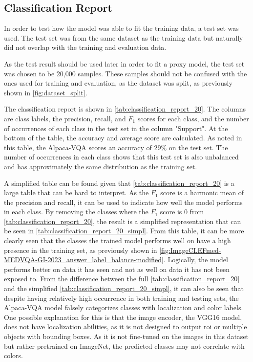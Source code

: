     \subsection{Classification Report}
        In order to test how the model was able to fit the training data, a test set was used. The test set was from the same dataset as the training data but naturally did not overlap with the training and evaluation data. 

        As the test result should be used later in order to fit a proxy model, the test set was chosen to be 20,000 samples. These samples should not be confused with the ones used for training and evaluation, as the dataset was split, as previously shown in \autoref{fig:dataset_split}.

        The classification report is shown in \autoref{tab:classification_report_20}. The columns are class labels, the precision, recall, and $F_1$ scores for each class, and the number of occurrences of each class in the test set in the column "Support". At the bottom of the table, the accuracy and average score are calculated. As noted in this table, the Alpaca-VQA scores an accuracy of 29\% on the test set. The number of occurrences in each class shows that this test set is also unbalanced and has approximately the same distribution as the training set.
        
        A simplified table can be found given that \autoref{tab:classification_report_20} is a large table that can be hard to interpret.
        As the $F_1$ score is a harmonic mean of the precision and recall, it can be used to indicate how well the model performs in each class. By removing the classes where the $F_1$ score is 0 from \autoref{tab:classification_report_20}, the result is a simplified representation that can be seen in \autoref{tab:classification_report_20_simpl}.
        From this table, it can be more clearly seen that the classes the trained model performs well on have a high presence in the training set, as previously shown in \autoref{fig:ImageCLEFmed-MEDVQA-GI-2023_answer_label_balance-modified}. Logically, the model performs better on data it has seen and not as well on data it has not been exposed to. From the difference between the full \autoref{tab:classification_report_20} and the simplified \autoref{tab:classification_report_20_simpl}, it can also be seen that despite having relatively high occurrence in both training and testing sets, the Alpaca-VQA model falsely categorizes classes with localization and color labels.
        One possible explanation for this is that the image encoder, the VGG16 model, does not have localization abilities, as it is not designed to output \gls{roi} or multiple objects with bounding boxes. As it is not fine-tuned on the images in this dataset but rather pretrained on ImageNet, the predicted classes may not correlate with colors.
        
        

